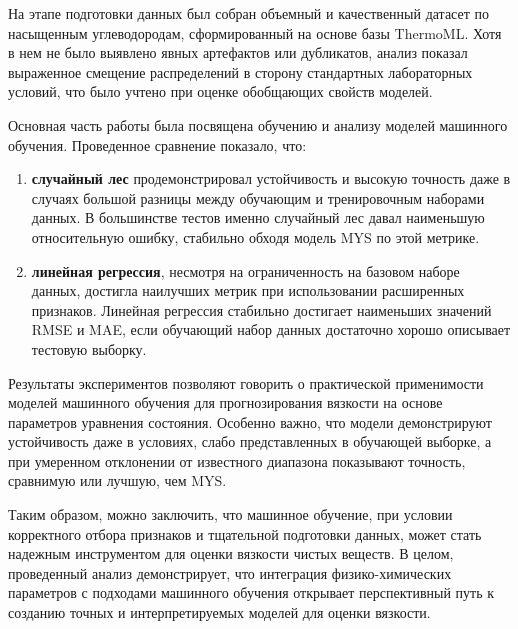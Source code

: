 \documentclass[a4paper,12pt]{article}
\begin{document}
  На этапе подготовки данных был собран объемный и качественный датасет по насыщенным углеводородам, сформированный на основе базы ThermoML. Хотя в нем не было выявлено явных артефактов или дубликатов, анализ показал выраженное смещение распределений в сторону стандартных лабораторных условий, что было учтено при оценке обобщающих свойств моделей.

  Основная часть работы была посвящена обучению и анализу моделей машинного обучения. Проведенное сравнение показало, что:

  \begin{enumerate}
    \item \textbf{случайный лес} продемонстрировал устойчивость и высокую точность даже в случаях большой разницы между обучающим и тренировочным наборами данных. В большинстве тестов именно случайный лес давал наименьшую относительную ошибку, стабильно обходя модель MYS по этой метрике.

    \item \textbf{линейная регрессия}, несмотря на ограниченность на базовом наборе данных, достигла наилучших метрик при использовании расширенных признаков. Линейная регрессия стабильно достигает наименьших значений RMSE и MAE, если обучающий набор данных достаточно хорошо описывает тестовую выборку.  
  \end{enumerate}

  Результаты экспериментов позволяют говорить о практической применимости моделей машинного обучения для прогнозирования вязкости на основе параметров уравнения состояния. Особенно важно, что модели демонстрируют устойчивость даже в условиях, слабо представленных в обучающей выборке, а при умеренном отклонении от известного диапазона показывают точность, сравнимую или лучшую, чем MYS.

Таким образом, можно заключить, что машинное обучение, при условии корректного отбора признаков и тщательной подготовки данных, может стать надежным инструментом для оценки вязкости чистых веществ. В целом, проведенный анализ демонстрирует, что интеграция физико-химических параметров с подходами машинного обучения открывает перспективный путь к созданию точных и интерпретируемых моделей для оценки вязкости.

\newpage
\end{document}
